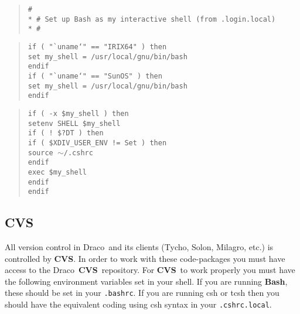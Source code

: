 \documentclass[11pt]{nmemo}
\newcommand{\comp}[1]{\normalfont\normalsize\texttt{#1}}
\newcommand{\draco}{{\normalfont\sffamily Draco}}
\newcommand{\tycho}{{\normalfont\sffamily Tycho}}
\newcommand{\solon}{{\normalfont\sffamily Solon}}
\newcommand{\milagro}{{\normalfont\sffamily Milagro}}
\newcommand{\cvs}{{\normalfont\bfseries CVS}}
\newcommand{\bash}{{\normalfont\bfseries Bash}}
\begin{document}
\begin{verse}
\texttt{\#\\*
\# Set up Bash as my interactive shell (from .login.local)\\*
\#
}
\end{verse}

\begin{verse}
\texttt{if ( "`uname`" == "IRIX64" ) then \\
\hspace*{0.25in} set my\_shell = /usr/local/gnu/bin/bash \\
endif \\
if ( "`uname`" == "SunOS" ) then \\
\hspace*{0.25in} set my\_shell = /usr/local/gnu/bin/bash \\
endif
}
\end{verse}

\begin{verse}
\texttt{if ( -x \$my\_shell ) then \\
\hspace*{0.25in}   setenv SHELL \$my\_shell \\
\hspace*{0.25in}   if ( ! \${?DT} ) then \\
\hspace*{0.5in}      if ( \$XDIV\_USER\_ENV != Set ) then \\
\hspace*{0.75in}         source $\sim$/.cshrc \\
\hspace*{0.5in}      endif \\
\hspace*{0.5in}      exec \$my\_shell \\
\hspace*{0.25in}   endif \\
endif
} 
\end{verse}

\subsection{CVS}

All version control in \draco\ and its clients (\tycho, \solon,
\milagro, etc.) is controlled by \cvs.  In order to work with these
code-packages you must have access to the \draco\ \cvs\ repository.
For \cvs\ to work properly you must have the following environment
variables set in your shell.  If you are running \bash, these should
be set in your \comp{.bashrc}.  If you are running csh or tcsh then
you should have the equivalent coding using csh syntax in your
\comp{.cshrc.local}.
\end{document}
